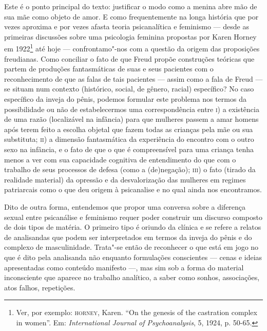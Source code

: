 Este é o ponto principal do texto: justificar o modo como a menina abre
mão de sua mãe como objeto de amor. E como frequentemente na longa
história que por vezes aproxima e por vezes afasta teoria psicanalítica
e feminismo --- desde as primeiras discussões sobre uma psicologia
feminina propostas por Karen Horney em 1922\footnote{Ver, por exemplo: \textsc{horney}, Karen.
``On the genesis of the castration complex in women''. Em:
  \emph{International Journal of Psychoanalysis}, 5, 1924, p. 50-65.} até hoje
--- confrontamo"-nos com a questão da origem das proposições freudianas.
Como conciliar o fato de que Freud propõe construções teóricas que
partem de produções fantasmáticas de suas e seus pacientes com o
reconhecimento de que as falas de tais pacientes --- assim como a fala de
Freud --- se situam num contexto (histórico, social, de gênero, racial)
específico? No caso específico da inveja do pênis, podemos formular
este problema nos termos da possibilidade ou não de estabelecermos uma
correspondência entre \textsc{i}) a existência de uma razão (localizável na
infância) para que mulheres passem a amar homens após terem feito a
escolha objetal que fazem todas as crianças pela mãe ou sua substituta;
\textsc{ii}) a dimensão fantasmática da experiência do encontro com o outro sexo
na infância, e o fato de que o que é compreensível para uma criança
tenha menos a ver com sua capacidade cognitiva de entendimento do que
com o trabalho de seus processos de defesa (como a (de)negação); \textsc{iii}) o
fato (tirado da realidade material) da opressão e da desvalorização das
mulheres em regimes patriarcais como o que deu origem à psicanalise e no
qual ainda nos encontramos.

Dito de outra forma, entendemos que propor uma conversa sobre a
diferença sexual entre psicanálise e feminismo requer poder construir um
discurso composto de dois tipos de matéria. O primeiro tipo é oriundo da
clínica e se refere a relatos de analisandas que podem ser interpretados
em termos da inveja do pênis e do complexo de masculinidade. Trata"-se
então de reconhecer o que está em jogo no que é dito pela analisanda não
enquanto formulações conscientes --- cenas e ideias apresentadas como
conteúdo manifesto ---, mas sim sob a forma do material inconsciente que
aparece no trabalho analítico, a saber como sonhos, associações, atos
falhos, repetições.

